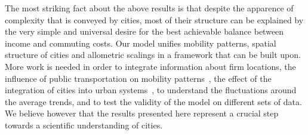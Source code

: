 The most striking fact about the above results is that despite the apparence of complexity that is conveyed by cities, most of their structure can be explained by the very simple and universal desire for the best achievable balance between income and commuting costs. Our model unifies mobility patterns, spatial structure of cities and allometric scalings in a framework that can be built upon. More work is needed in order to integrate information about firm locations, the influence of public transportation on mobility patterns~\cite{Roth:2011}, the effect of the integration of cities into urban systems~\cite{Rozenblat:2007}, to understand the fluctuations around the average trends, and to test the validity of the model on different sets of data. We believe however that the results presented here represent a crucial step towards a scientific understanding of cities.
